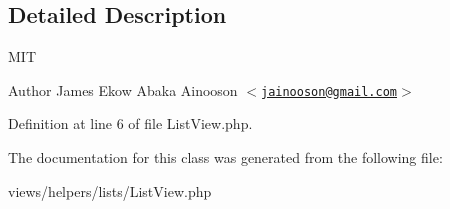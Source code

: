 \subsection{Detailed Description}
MIT \begin{DoxyAuthor}{Author}
James Ekow Abaka Ainooson $<$\href{mailto:jainooson@gmail.com}{\tt jainooson@gmail.com}$>$ 
\end{DoxyAuthor}


Definition at line 6 of file ListView.php.



The documentation for this class was generated from the following file:\begin{DoxyCompactItemize}
\item 
views/helpers/lists/ListView.php\end{DoxyCompactItemize}
